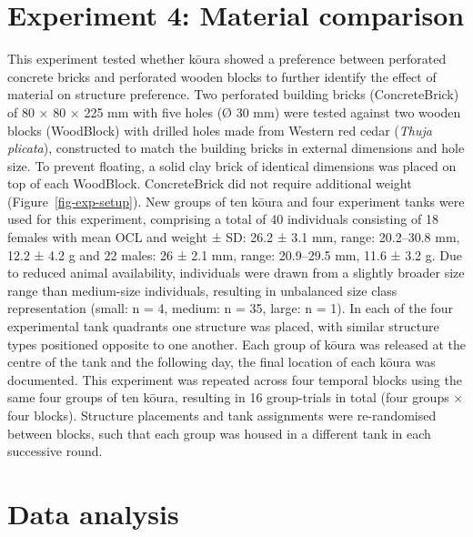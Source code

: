 \documentclass[
  12pt,
  a4paper,
]{scrbook}
\begin{document}
\section{Experiment 4: Material
comparison}\label{experiment-4-material-comparison}

This experiment tested whether kōura showed a preference between
perforated concrete bricks and perforated wooden blocks to further
identify the effect of material on structure preference. Two perforated
building bricks (ConcreteBrick) of 80 × 80 × 225 mm with five holes (Ø
30 mm) were tested against two wooden blocks (WoodBlock) with drilled
holes made from Western red cedar (\emph{Thuja plicata}), constructed to
match the building bricks in external dimensions and hole size. To
prevent floating, a solid clay brick of identical dimensions was placed
on top of each WoodBlock. ConcreteBrick did not require additional
weight (Figure~\ref{fig-exp-setup}). New groups of ten kōura and four
experiment tanks were used for this experiment, comprising a total of 40
individuals consisting of 18 females with mean OCL and weight ± SD: 26.2
± 3.1 mm, range: 20.2--30.8 mm, 12.2 ± 4.2 g and 22 males: 26 ± 2.1 mm,
range: 20.9--29.5 mm, 11.6 ± 3.2 g. Due to reduced animal availability,
individuals were drawn from a slightly broader size range than
medium-size individuals, resulting in unbalanced size class
representation (small: n = 4, medium: n = 35, large: n = 1). In each of
the four experimental tank quadrants one structure was placed, with
similar structure types positioned opposite to one another. Each group
of kōura was released at the centre of the tank and the following day,
the final location of each kōura was documented. This experiment was
repeated across four temporal blocks using the same four groups of ten
kōura, resulting in 16 group-trials in total (four groups × four
blocks). Structure placements and tank assignments were re-randomised
between blocks, such that each group was housed in a different tank in
each successive round.

\section{Data analysis}\label{data-analysis-1}
\end{document}
